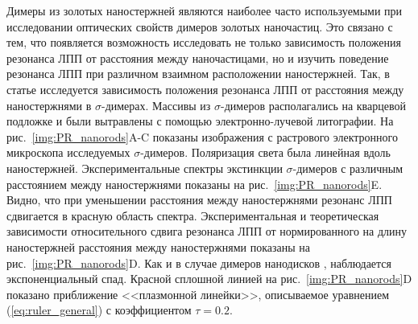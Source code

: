 Димеры из золотых наностержней являются наиболее часто используемыми при исследовании оптических свойств димеров золотых наночастиц. Это связано с тем, что появляется возможность исследовать не только зависимость положения резонанса ЛПП от расстояния между наночастицами, но и изучить поведение резонанса ЛПП при различном взаимном расположении наностержней. Так, в статье \cite{nanorods2} исследуется зависимость положения резонанса ЛПП от расстояния между наностержнями в $ \sigma $-димерах. Массивы из $ \sigma $-димеров располагались на кварцевой подложке и были вытравлены с помощью электронно-лучевой литографии. На рис.~\ref{img:PR_nanorods}A-C показаны изображения с растрового электронного микроскопа исследуемых $ \sigma $-димеров. Поляризация света была линейная вдоль наностержней. Экспериментальные спектры экстинкции $ \sigma $-димеров с различным расстоянием между наностержнями показаны на рис.~\ref{img:PR_nanorods}E. Видно, что при уменьшении расстояния между наностержнями резонанс ЛПП сдвигается в красную область спектра. Экспериментальная и теоретическая зависимости относительного сдвига резонанса ЛПП от нормированного на длину наностержней расстояния между наностержнями показаны на рис.~\ref{img:PR_nanorods}D. Как и в случае димеров нанодисков \cite{plasonrulereq}, наблюдается экспоненциальный спад. Красной сплошной линией на рис.~\ref{img:PR_nanorods}D показано приближение <<плазмонной линейки>>, описываемое уравнением (\ref{eq:ruler_general})  с коэффициентом $ \tau = 0.2 $.

